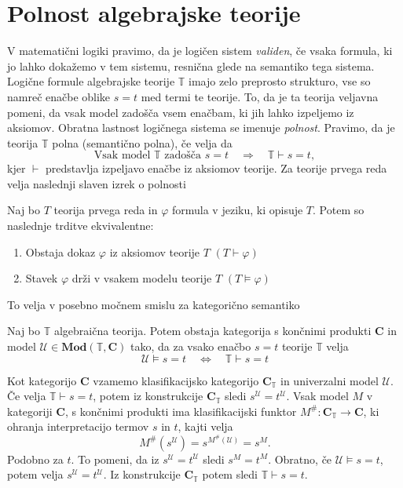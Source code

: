 \documentclass[../kategoricna_logika.tex]{subfiles}
\begin{document}
\section{Polnost algebrajske teorije}
V matematični logiki pravimo, da je logičen sistem \emph{validen},
če vsaka formula, ki jo lahko dokažemo v tem sistemu, resnična
glede na semantiko tega sistema. Logične formule algebrajske teorije
$\mathbb{T}$ imajo zelo preprosto strukturo, vse so namreč enačbe
oblike $s = t$ med termi te teorije. To, da je ta teorija veljavna
pomeni, da vsak model zadošča vsem enačbam, ki jih lahko izpeljemo
iz aksiomov. Obratna lastnost logičnega sistema se imenuje \emph{polnost}.
Pravimo, da je teorija $\mathbb{T}$ polna (semantično polna), če velja
da
$$\text{Vsak model } \mathbb{T} \text{ zadošča }s=t \quad \Longrightarrow \quad \mathbb{T} \vdash s = t,$$
kjer $\vdash$ predstavlja izpeljavo enačbe iz aksiomov teorije.
Za teorije prvega reda velja naslednji slaven izrek o polnosti \cite{godel-completeness}
\begin{izrek}[Gödel]
  Naj bo $T$ teorija prvega reda in $\varphi$ formula v jeziku, ki
  opisuje $T$. Potem so naslednje trditve ekvivalentne:
  \begin{enumerate}
  \item Obstaja dokaz $\varphi$ iz aksiomov teorije $T$
    $(T \vdash \varphi)$
  \item Stavek $\varphi$ drži v vsakem modelu teorije $T$
    $(T \models \varphi)$
  \end{enumerate}
\end{izrek}
To velja v posebno močnem smislu za kategorično semantiko
\begin{izrek}
  Naj bo $\mathbb{T}$ algebraična teorija. Potem obstaja kategorija s
  končnimi produkti $\mathbf{C}$ in model
  $\mathcal{U} \in \mathbf{Mod}(\mathbb{T}, \mathbf{C})$ tako, da za vsako
  enačbo $s = t$ teorije $\mathbb{T}$ velja
$$\mathcal{U} \models s = t \quad \Longleftrightarrow \quad \mathbb{T} \vdash s = t$$
\end{izrek}
\begin{dokaz}
  Kot kategorijo $\mathbf{C}$ vzamemo klasifikacijsko kategorijo
  $\mathbf{C}_\mathbb{T}$ in univerzalni model $\mathcal{U}$. Če
  velja $\mathbb{T} \vdash s = t$, potem iz konstrukcije
  $\mathbf{C}_\mathbb{T}$ sledi $s^\mathcal{U} =
  t^\mathcal{U}$. Vsak model $M$ v kategoriji $\mathbf{C}$,
  s končnimi produkti ima klasifikacijski funktor $M^{\#} : \mathbf{C}_{\mathbb{T}} \to \mathbf{C}$,
  ki ohranja interpretacijo termov $s$ in $t$, kajti velja
  \[ M^{\#}(s^\mathcal{U}) = s^{M^{\#}(\mathcal{U})} = s^M. \]
  Podobno za $t$.
  To pomeni, da iz $s^{\mathcal{U}} = t^{\mathcal{U}}$ sledi $s^M = t^M$.
  Obratno, če ${\mathcal{U} \models s = t}$, potem velja $s^{\mathcal{U}} = t^{\mathcal{U}}$.
  Iz konstrukcije $\mathbf{C}_{\mathbb{T}}$ potem sledi ${\mathbb{T} \vdash s = t}$.
\end{dokaz}
\end{document}
